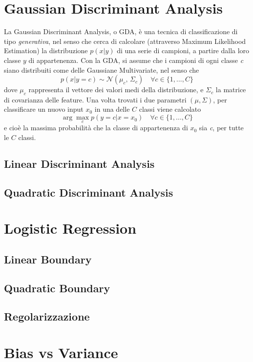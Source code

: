 \documentclass[a4paper,8pt]{article}
\begin{document}
\begin{multicols}{2}
\section{Gaussian Discriminant Analysis}
La Gaussian Discriminant Analysis, o GDA, è una tecnica di classificazione di tipo \emph{generativa}, nel senso che cerca di calcolare (attraverso Maximum Likelihood Estimation) la distribuzione $p(x | y)$ di una serie di campioni, a partire dalla loro classe $y$ di appartenenza. Con la GDA, si assume che i campioni di ogni classe \emph{c} siano distribuiti come delle Gaussiane Multivariate, nel senso che
\begin{equation}
p(x|y=c) \sim \mathcal{N}(\mu_{c},\,\Sigma_{c})\quad \forall{c} \in \{1, ..., C\}
\end{equation}
dove $\mu_{c}$ rappresenta il vettore dei valori medi della distribuzione, e $\Sigma_{c}$ la matrice di covarianza delle feature.
Una volta trovati i due parametri $(\mu, \Sigma)$, per classificare un nuovo input $x_{0}$ in una delle $C$ classi viene calcolato
\begin{equation}
\arg\max_{c}p(y = c|x = x_{0}) \quad \forall{c} \in \{1, ..., C\}
\end{equation}
e cioè la massima probabilità che la classe di appartenenza di $x_{0}$ sia \emph{c}, per tutte le $C$ classi.
\subsection{Linear Discriminant Analysis}
\subsection{Quadratic Discriminant Analysis}
\section{Logistic Regression}
\subsection{Linear Boundary}
\subsection{Quadratic Boundary}
\subsection{Regolarizzazione}
\section{Bias vs Variance}
\end{multicols}
\end{document}
